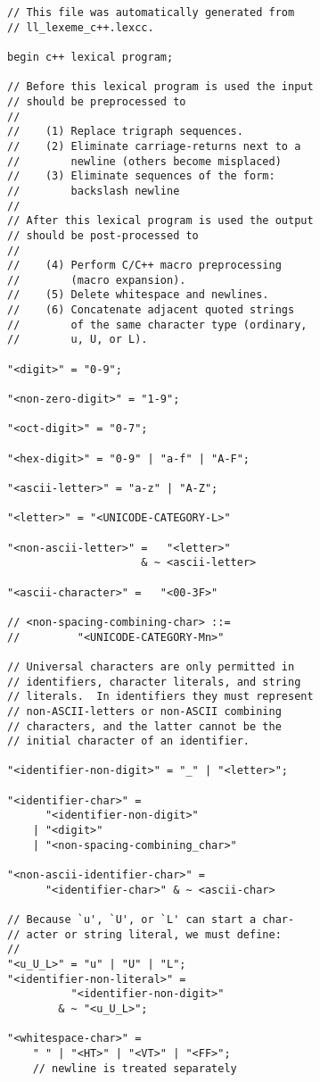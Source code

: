 \documentclass[12pt]{article}
\newenvironment{indpar}[1][0.3in]%
	{\begin{list}{}%
		     {\setlength{\itemsep}{0in}%
		      \setlength{\topsep}{0in}%
		      \setlength{\parsep}{1ex}%
		      \setlength{\labelwidth}{#1}%
		      \setlength{\leftmargin}{#1}%
		      \addtolength{\leftmargin}{\labelsep}}%
	 \item}%
	{\end{list}}
\begin{document}
\begin{indpar}\begin{verbatim}
// This file was automatically generated from
// ll_lexeme_c++.lexcc.

begin c++ lexical program;

// Before this lexical program is used the input
// should be preprocessed to
//
//    (1) Replace trigraph sequences.
//    (2) Eliminate carriage-returns next to a
//        newline (others become misplaced)
//    (3) Eliminate sequences of the form:
//        backslash newline
//
// After this lexical program is used the output
// should be post-processed to
//
//    (4) Perform C/C++ macro preprocessing
//        (macro expansion).
//    (5) Delete whitespace and newlines.
//    (6) Concatenate adjacent quoted strings
//        of the same character type (ordinary,
//        u, U, or L).

"<digit>" = "0-9";

"<non-zero-digit>" = "1-9";

"<oct-digit>" = "0-7";

"<hex-digit>" = "0-9" | "a-f" | "A-F";

"<ascii-letter>" = "a-z" | "A-Z";

"<letter>" = "<UNICODE-CATEGORY-L>"

"<non-ascii-letter>" =   "<letter>"
                     & ~ <ascii-letter>

"<ascii-character>" =   "<00-3F>"

// <non-spacing-combining-char> ::=
//         "<UNICODE-CATEGORY-Mn>"

// Universal characters are only permitted in
// identifiers, character literals, and string
// literals.  In identifiers they must represent
// non-ASCII-letters or non-ASCII combining
// characters, and the latter cannot be the
// initial character of an identifier.

"<identifier-non-digit>" = "_" | "<letter>";

"<identifier-char>" =
      "<identifier-non-digit>"
    | "<digit>"
    | "<non-spacing-combining_char>"

"<non-ascii-identifier-char>" =
      "<identifier-char>" & ~ <ascii-char>

// Because `u', `U', or `L' can start a char-
// acter or string literal, we must define:
//
"<u_U_L>" = "u" | "U" | "L";
"<identifier-non-literal>" =
          "<identifier-non-digit>"
        & ~ "<u_U_L>";

"<whitespace-char>" =
    " " | "<HT>" | "<VT>" | "<FF>";
    // newline is treated separately



\end{verbatim}
\end{indpar}
\end{document}
